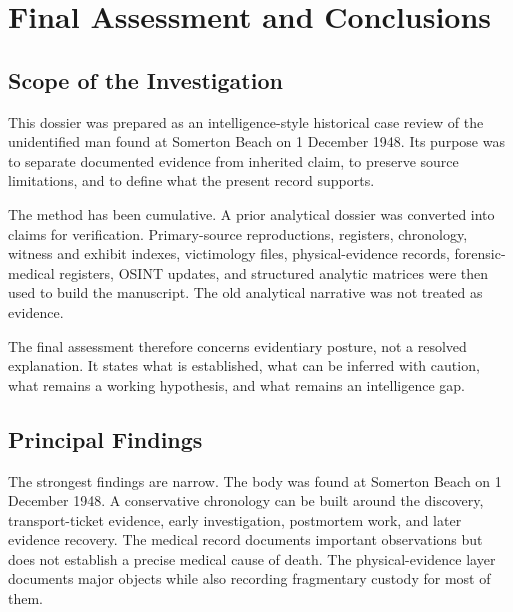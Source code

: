 \chapter{Final Assessment and Conclusions}
\label{chap:final-assessment-and-conclusions}


\section{Scope of the Investigation}

This dossier was prepared as an intelligence-style historical case review of the unidentified man found at Somerton Beach on 1 December 1948. Its purpose was to separate documented evidence from inherited claim, to preserve source limitations, and to define what the present record supports.

The method has been cumulative. A prior analytical dossier was converted into claims for verification. Primary-source reproductions, registers, chronology, witness and exhibit indexes, victimology files, physical-evidence records, forensic-medical registers, OSINT updates, and structured analytic matrices were then used to build the manuscript. The old analytical narrative was not treated as evidence.

The final assessment therefore concerns evidentiary posture, not a resolved explanation. It states what is established, what can be inferred with caution, what remains a working hypothesis, and what remains an intelligence gap.

\section{Principal Findings}

The strongest findings are narrow. The body was found at Somerton Beach on 1 December 1948. A conservative chronology can be built around the discovery, transport-ticket evidence, early investigation, postmortem work, and later evidence recovery. The medical record documents important observations but does not establish a precise medical cause of death. The physical-evidence layer documents major objects while also recording fragmentary custody for most of them.

